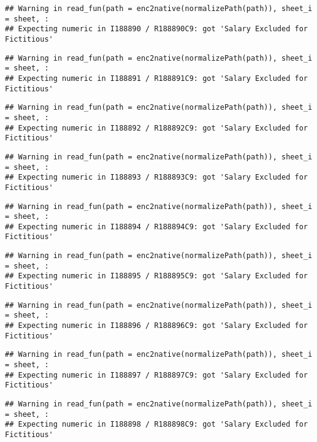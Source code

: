 \documentclass[
]{article}
\begin{document}
\begin{verbatim}
## Warning in read_fun(path = enc2native(normalizePath(path)), sheet_i = sheet, :
## Expecting numeric in I188890 / R188890C9: got 'Salary Excluded for Fictitious'
\end{verbatim}

\begin{verbatim}
## Warning in read_fun(path = enc2native(normalizePath(path)), sheet_i = sheet, :
## Expecting numeric in I188891 / R188891C9: got 'Salary Excluded for Fictitious'
\end{verbatim}

\begin{verbatim}
## Warning in read_fun(path = enc2native(normalizePath(path)), sheet_i = sheet, :
## Expecting numeric in I188892 / R188892C9: got 'Salary Excluded for Fictitious'
\end{verbatim}

\begin{verbatim}
## Warning in read_fun(path = enc2native(normalizePath(path)), sheet_i = sheet, :
## Expecting numeric in I188893 / R188893C9: got 'Salary Excluded for Fictitious'
\end{verbatim}

\begin{verbatim}
## Warning in read_fun(path = enc2native(normalizePath(path)), sheet_i = sheet, :
## Expecting numeric in I188894 / R188894C9: got 'Salary Excluded for Fictitious'
\end{verbatim}

\begin{verbatim}
## Warning in read_fun(path = enc2native(normalizePath(path)), sheet_i = sheet, :
## Expecting numeric in I188895 / R188895C9: got 'Salary Excluded for Fictitious'
\end{verbatim}

\begin{verbatim}
## Warning in read_fun(path = enc2native(normalizePath(path)), sheet_i = sheet, :
## Expecting numeric in I188896 / R188896C9: got 'Salary Excluded for Fictitious'
\end{verbatim}

\begin{verbatim}
## Warning in read_fun(path = enc2native(normalizePath(path)), sheet_i = sheet, :
## Expecting numeric in I188897 / R188897C9: got 'Salary Excluded for Fictitious'
\end{verbatim}

\begin{verbatim}
## Warning in read_fun(path = enc2native(normalizePath(path)), sheet_i = sheet, :
## Expecting numeric in I188898 / R188898C9: got 'Salary Excluded for Fictitious'
\end{verbatim}
\end{document}
